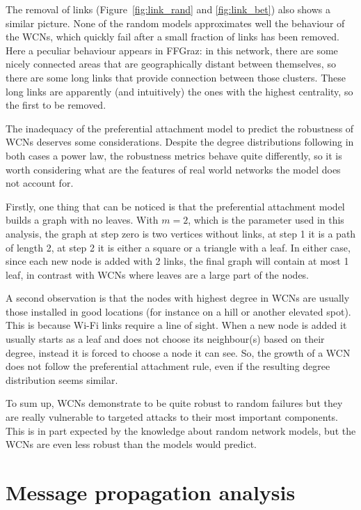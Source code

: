 \documentclass[a4paper,11pt,twoside,openright]{memoir}
\newcommand{\figref}[1] {Figure~\ref{#1}}
\begin{document}
The removal of links (\figref{fig:link_rand} and \ref{fig:link_bet})
also shows a similar picture. None of the random
models approximates well the behaviour of the WCNs, which quickly fail
after a small fraction of links has been removed. Here a peculiar
behaviour appears in FFGraz: in this network, there are some nicely
connected areas that are geographically distant between themselves, so
there are some long links that provide connection between those
clusters. These long links are apparently (and intuitively) the ones
with the highest centrality, so the first to be removed.

The inadequacy of the preferential attachment model to predict the
robustness of WCNs deserves some considerations. Despite the degree
distributions following in both cases a power law, the robustness
metrics behave quite differently, so it is worth considering what are
the features of real world networks the model does not account for.

Firstly, one thing that can be noticed is that the preferential
attachment model builds a graph with no leaves. With $m = 2$, which is
the parameter used in this analysis, the graph at step zero is two
vertices without links, at step 1 it is a path of length 2, at step 2 it
is either a square or a triangle with a leaf.
In either case, since each new node is added with 2 links, the final
graph will contain at most 1 leaf, in contrast with WCNs where leaves
are a large part of the nodes.

A second observation is that the nodes with highest degree in WCNs
are usually those installed in good locations (for instance on a hill
or another elevated spot). This is because Wi-Fi links require a line
of sight.
When a new node is added it usually starts as a leaf and does not choose
its neighbour(s) based on their degree, instead it is forced to choose
a node it can see.
So, the growth of a WCN does not follow the preferential attachment rule,
even if the resulting degree distribution seems similar.

To sum up, WCNs demonstrate to be quite robust to random failures but
they are really vulnerable to targeted attacks to their most important
components. This is in part expected by the knowledge about
random network models, but the WCNs are even less robust than the models
would predict.

\chapter{Message propagation analysis}\label{message-propagation-analysis}
\end{document}
